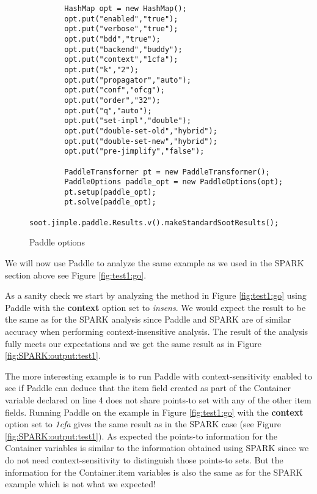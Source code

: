 \documentclass{article}
\begin{document}

\begin{figure}[htb]
  \centering
  \begin{verbatim}
        HashMap opt = new HashMap();
        opt.put("enabled","true");
        opt.put("verbose","true");
        opt.put("bdd","true");
        opt.put("backend","buddy");
        opt.put("context","1cfa");
        opt.put("k","2");
        opt.put("propagator","auto");
        opt.put("conf","ofcg");
        opt.put("order","32");
        opt.put("q","auto");
        opt.put("set-impl","double");
        opt.put("double-set-old","hybrid");
        opt.put("double-set-new","hybrid");
        opt.put("pre-jimplify","false");
        
        PaddleTransformer pt = new PaddleTransformer();
        PaddleOptions paddle_opt = new PaddleOptions(opt);
        pt.setup(paddle_opt);
        pt.solve(paddle_opt);
        soot.jimple.paddle.Results.v().makeStandardSootResults();
  \end{verbatim}
  \caption{Paddle options}
  \label{fig:paddle:options}
\end{figure}

We will now use Paddle to analyze the same example as we used in the
SPARK section above see Figure \ref{fig:test1:go}.

As a sanity check we start by analyzing the method in Figure
\ref{fig:test1:go} using Paddle with the \textbf{context} option set
to \emph{insens}. We would expect the result to be the same as for the
SPARK analysis since Paddle and SPARK are of similar accuracy when
performing context-insensitive analysis. The result of the analysis
fully meets our expectations and we get the same result as in Figure
\ref{fig:SPARK:output:test1}.

The more interesting example is to run Paddle with context-sensitivity
enabled to see if Paddle can deduce that the item field created as
part of the Container variable declared on line 4 does not share
points-to set with any of the other item fields. Running Paddle on the
example in Figure \ref{fig:test1:go} with the \textbf{context} option
set to \emph{1cfa} gives the same result as in the SPARK case (see
Figure \ref{fig:SPARK:output:test1}). As expected the points-to
information for the Container variables is similar to the information
obtained using SPARK since we do not need context-sensitivity to
distinguish those points-to sets. But the information for the
Container.item variables is also the same as for the SPARK example
which is not what we expected!
\end{document}
